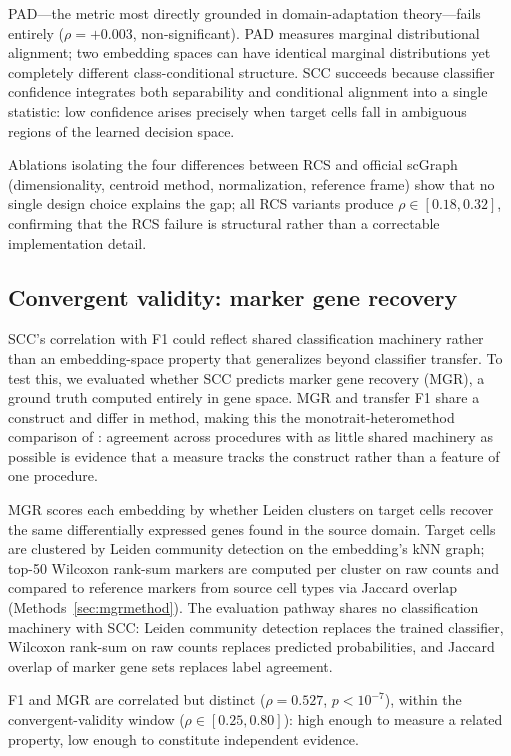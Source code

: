 \documentclass[11pt]{article}
\begin{document}
PAD---the metric most directly grounded in domain-adaptation
theory---fails entirely ($\rho = +0.003$, non-significant). PAD
measures marginal distributional alignment; two embedding spaces can have
identical marginal distributions yet completely different class-conditional
structure. SCC succeeds because classifier confidence integrates both
separability and conditional alignment into a single statistic: low
confidence arises precisely when target cells fall in ambiguous regions
of the learned decision space.

Ablations isolating the four differences between RCS and official scGraph
(dimensionality, centroid method, normalization, reference frame) show
that no single design choice explains the gap; all RCS variants
produce $\rho \in [0.18, 0.32]$, confirming that the RCS failure is
structural rather than a correctable implementation detail.


\subsection{Convergent validity: marker gene recovery}
\label{sec:mgr}

SCC's correlation with F1 could reflect shared classification
machinery rather than an embedding-space property that generalizes
beyond classifier transfer. To test this, we evaluated whether SCC
predicts marker gene recovery (MGR), a ground truth computed entirely
in gene space. MGR and transfer F1 share a construct and differ in
method, making this the monotrait-heteromethod comparison of
\citet{campbell1959convergent}: agreement across procedures with as
little shared machinery as possible is evidence that a measure tracks
the construct rather than a feature of one procedure.

MGR scores each embedding by whether Leiden clusters on target cells
recover the same differentially expressed genes found in the source
domain. Target cells are clustered by Leiden community detection on
the embedding's kNN graph; top-50 Wilcoxon rank-sum markers are
computed per cluster on raw counts and compared to reference markers
from source cell types via Jaccard overlap
(Methods~\ref{sec:mgrmethod}). The evaluation pathway shares no
classification machinery with SCC: Leiden community detection replaces
the trained classifier, Wilcoxon rank-sum on raw counts replaces
predicted probabilities, and Jaccard overlap of marker gene sets
replaces label agreement.

F1 and MGR are correlated but distinct ($\rho = 0.527$,
$p < 10^{-7}$), within the convergent-validity window
($\rho \in [0.25, 0.80]$): high enough to measure a related property,
low enough to constitute independent evidence.
\end{document}
